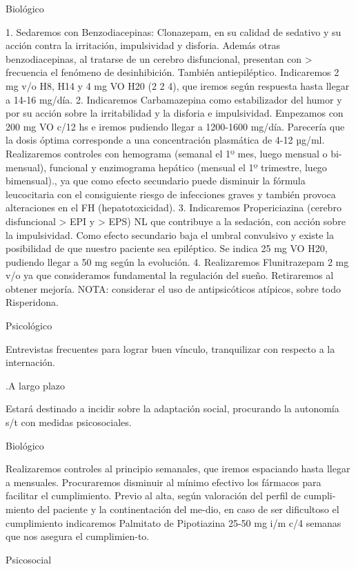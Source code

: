 \documentclass[encares.tex]{subfiles}
\begin{document}
Biológico

1. Sedaremos con Benzodiacepinas: Clonazepam, en su calidad de sedativo y su acción contra la irritación, impulsividad y disforia. Además otras benzodiacepinas, al tratarse de un cerebro disfuncional, presentan con > frecuencia el fenómeno de desinhibición. También antiepiléptico. Indicaremos 2 mg v/o H8, H14 y 4 mg VO H20 (2 2 4), que iremos según respuesta hasta llegar a 14-16 mg/día.
2. Indicaremos Carbamazepina como estabilizador del humor y por su acción sobre la irritabilidad y la disforia e impulsividad. Empezamos con 200 mg VO c/12 hs e iremos pudiendo llegar a 1200-1600 mg/día. Parecería que la dosis óptima corresponde a una concentración plasmática de 4-12 µg/ml. Realizaremos controles con hemograma (semanal el 1º mes, luego mensual o bi-mensual), funcional y enzimograma hepático (mensual el 1º trimestre, luego bimensual)., ya que como efecto secundario puede disminuir la fórmula leucocitaria con el consiguiente riesgo de infecciones graves y también provoca alteraciones en el FH (hepatotoxicidad).
3. Indicaremos Propericiazina (cerebro disfuncional > EPI y > EPS) NL que contribuye a la sedación, con acción sobre la impulsividad. Como efecto secundario baja el umbral convulsivo y existe la posibilidad de que nuestro paciente sea epiléptico. Se indica 25 mg VO H20, pudiendo llegar a 50 mg según la evolución.
4. Realizaremos Flunitrazepam 2 mg v/o ya que consideramos fundamental la regulación del sueño. Retiraremos al obtener mejoría. NOTA: considerar el uso de antipsicóticos atípicos, sobre todo Risperidona.

Psicológico

Entrevistas frecuentes para lograr buen vínculo, tranquilizar con respecto a la internación.

.A largo plazo

Estará destinado a incidir sobre la adaptación social, procurando la autonomía s/t con medidas psicosociales.

Biológico

Realizaremos controles al principio semanales, que iremos espaciando hasta llegar a mensuales. Procuraremos disminuir al mínimo efectivo los fármacos para facilitar el cumplimiento. Previo al alta, según valoración del perfil de cumpli-miento del paciente y la continentación del me-dio, en caso de ser dificultoso el cumplimiento indicaremos Palmitato de Pipotiazina 25-50 mg i/m c/4 semanas que nos asegura el cumplimien-to.

Psicosocial
\end{document}
